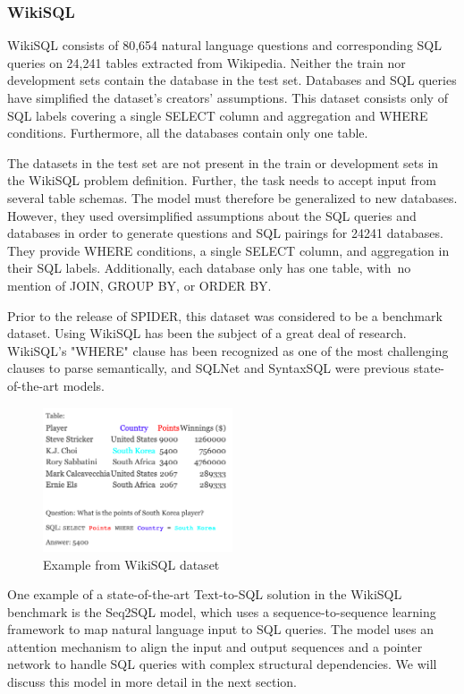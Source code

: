 \subsubsection{WikiSQL}

WikiSQL\cite{DBLP:journals/corr/abs-1902-01069} consists of 80,654 natural language questions and corresponding SQL queries on 24,241 tables extracted from Wikipedia. Neither the train nor development sets contain the database in the test set. Databases and SQL queries have simplified the dataset's creators' assumptions. This dataset consists only of SQL labels covering a single SELECT column and aggregation and WHERE conditions. Furthermore, all the databases contain only one table.

The datasets in the test set are not present in the train or development sets in the WikiSQL problem definition. Further, the task needs to accept input from several table schemas. The model must therefore be generalized to new databases. However, they used oversimplified assumptions about the SQL queries and databases in order to generate questions and SQL pairings for 24241 databases. They provide WHERE conditions, a single SELECT column, and aggregation in their SQL labels. Additionally, each database only has one table, with no mention of JOIN, GROUP BY, or ORDER BY.

Prior to the release of SPIDER, this dataset was considered to be a benchmark dataset. Using WikiSQL has been the subject of a great deal of research. WikiSQL's "WHERE" clause has been recognized as one of the most challenging clauses to parse semantically, and SQLNet and SyntaxSQL were previous state-of-the-art models.


\begin{figure}[htb]
    \centering
    \includegraphics[width=0.5\textwidth]{pics/db/WikiSQL.png}
    \caption{Example from WikiSQL dataset\cite{DBLP:journals/corr/abs-1902-01069}}
    \label{fig:WikiSQL}
\end{figure}

One example of a state-of-the-art Text-to-SQL solution in the WikiSQL benchmark is the Seq2SQL model, which uses a sequence-to-sequence learning framework to map natural language input to SQL queries. The model uses an attention mechanism to align the input and output sequences and a pointer network to handle SQL queries with complex structural dependencies. We will discuss this model in more detail in the next section.